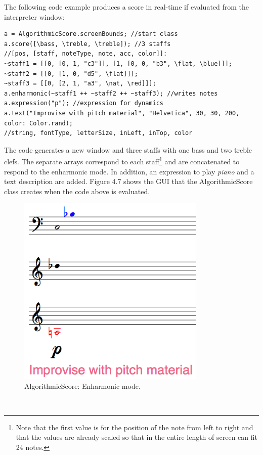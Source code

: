 The following code example produces a score in real-time if evaluated from the interpreter window: 
\begin{verbatim}
a = AlgorithmicScore.screenBounds; //start class
a.score([\bass, \treble, \treble]); //3 staffs
//[pos, [staff, noteType, note, acc, color]]:
~staff1 = [[0, [0, 1, "c3"]], [1, [0, 0, "b3", \flat, \blue]]]; 
~staff2 = [[0, [1, 0, "d5", \flat]]];
~staff3 = [[0, [2, 1, "a3", \nat, \red]]];
a.enharmonic(~staff1 ++ ~staff2 ++ ~staff3); //writes notes
a.expression("p"); //expression for dynamics
a.text("Improvise with pitch material", "Helvetica", 30, 30, 200, color: Color.rand);
//string, fontType, letterSize, inLeft, inTop, color  
\end{verbatim}
The code generates a new window and three staffs with one bass and two treble clefs. The separate arrays correspond to each staff\footnote{Note that the first value is for the position of the note from left to right and that the values are already scaled so that in the entire length of screen can fit 24 notes.} and are concatenated to respond to the enharmonic mode. In addition, an expression to play \emph{piano} and a text description are added. Figure 4.7 shows the GUI that the AlgorithmicScore class creates when the code above is evaluated. 
\begin{figure}[htbp] %
   \centering
   \includegraphics[width=9cm]{Chapter4/algoscore1.tif} %
   \caption{AlgorithmicScore: Enharmonic mode.}
   \label{fig:example}
\end{figure}\

